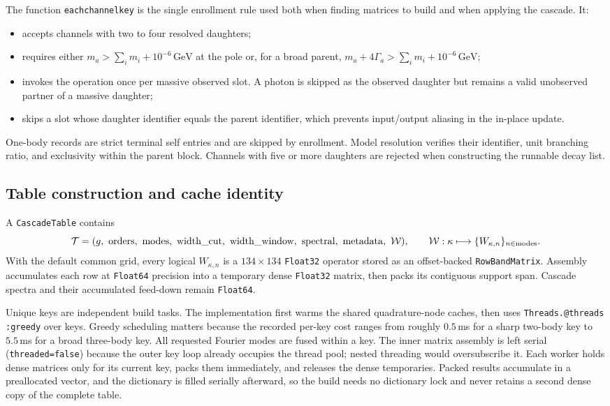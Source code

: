 \documentclass[11pt]{article}
\begin{document}
The function \texttt{eachchannelkey} is the single enrollment rule used both
when finding matrices to build and when applying the cascade.  It:
\begin{itemize}
\item accepts channels with two to four resolved daughters;
\item requires either
$m_a>\sum_i m_i+10^{-6}\,\mathrm{GeV}$ at the pole or, for a broad parent,
$m_a+4\Gamma_a>\sum_i m_i+10^{-6}\,\mathrm{GeV}$;
\item invokes the operation once per massive observed slot.  A photon is
skipped as the observed daughter but remains a valid unobserved partner of a
massive daughter;
\item skips a slot whose daughter identifier equals the parent identifier,
which prevents input/output aliasing in the in-place update.
\end{itemize}
One-body records are strict terminal self entries and are skipped by
enrollment.  Model resolution verifies their identifier, unit branching
ratio, and exclusivity within the parent block.  Channels with five or more
daughters are rejected when constructing the runnable decay list.

\subsection{Table construction and cache identity}

A \texttt{CascadeTable} contains
\begin{equation}
\mathcal T=(g,\ {\rm orders},\ {\rm modes},\
{\rm width\_cut},\ {\rm width\_window},\ {\rm spectral},\
{\rm metadata},\ \mathcal W),
\qquad
\mathcal W:\kappa\longmapsto
\{W_{\kappa,n}\}_{n\in{\rm modes}} .
\end{equation}
With the default common grid, every logical $W_{\kappa,n}$ is a
$134\times134$ \texttt{Float32} operator stored as an offset-backed
\texttt{RowBandMatrix}.  Assembly accumulates each row at \texttt{Float64}
precision into a temporary dense \texttt{Float32} matrix, then packs its
contiguous support span.  Cascade spectra and their accumulated feed-down
remain \texttt{Float64}.

Unique keys are independent build tasks.  The implementation first warms the
shared quadrature-node caches, then uses
\texttt{Threads.@threads :greedy} over keys.  Greedy scheduling matters
because the recorded per-key cost ranges from roughly $0.5$\,ms for a sharp
two-body key to $5.5$\,ms for a broad three-body key.  All requested Fourier
modes are fused within a key.  The inner matrix assembly is left serial
(\texttt{threaded=false}) because the outer key loop already occupies the
thread pool; nested threading would oversubscribe it.  Each worker holds dense
matrices only for its current key, packs them immediately, and releases the
dense temporaries.  Packed results accumulate in a preallocated vector, and
the dictionary is filled serially afterward, so the build needs no dictionary
lock and never retains a second dense copy of the complete table.
\end{document}
